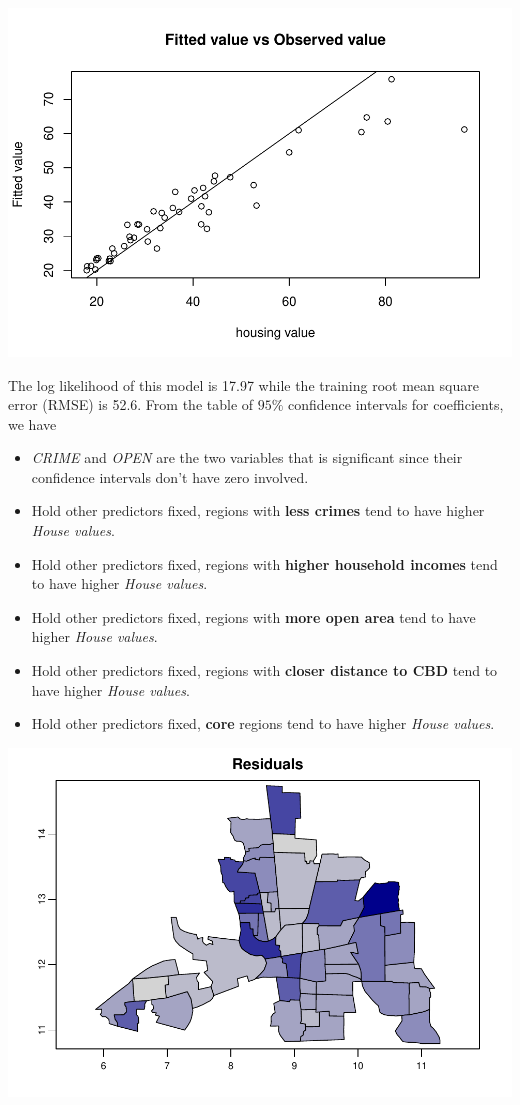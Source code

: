 \documentclass[
]{article}
\providecommand{\tightlist}{%
  \setlength{\itemsep}{0pt}\setlength{\parskip}{0pt}}
\begin{document}
\includegraphics{midterm-project_files/figure-latex/unnamed-chunk-45-1.pdf}

The log likelihood of this model is 17.97 while the training root mean
square error (RMSE) is 52.6. From the table of \(95\%\) confidence
intervals for coefficients, we have

\begin{itemize}
\tightlist
\item
  \emph{CRIME} and \emph{OPEN} are the two variables that is significant
  since their confidence intervals don't have zero involved.
\item
  Hold other predictors fixed, regions with \textbf{less crimes} tend to
  have higher \emph{House values}.
\item
  Hold other predictors fixed, regions with \textbf{higher household
  incomes} tend to have higher \emph{House values}.
\item
  Hold other predictors fixed, regions with \textbf{more open area} tend
  to have higher \emph{House values}.
\item
  Hold other predictors fixed, regions with \textbf{closer distance to
  CBD} tend to have higher \emph{House values}.
\item
  Hold other predictors fixed, \textbf{core} regions tend to have higher
  \emph{House values}.
\end{itemize}

\includegraphics{midterm-project_files/figure-latex/unnamed-chunk-46-1.pdf}
\end{document}
